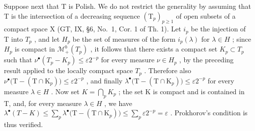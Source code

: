Suppose next that T is Polish. We do not restrict the generality by assuming that T is the intersection of a decreasing sequence \((\mathrm{T}_{p})_{p\geqslant1}\) of open subsets of a compact space X (GT, IX, §6, No.~1, Cor. 1 of Th. 1). Let \(i_{p}\) be the injection of T into \(T_{p}\) , and let \(H_{p}\) be the set of measures of the form \(i_{p}(\lambda)\) for \(\lambda\in H\) ; since \(H_{p}\) is compact in \(\mathcal{M}_{+}^{b}(T_{p})\) , it follows that there exists a compact set \(K_{p}\subset T_{p}\) such that \(\nu^{\bullet}(T_{p}-K_{p})\leqslant\varepsilon2^{-p}\) for every measure \(\nu\in H_{p}\) , by the preceding result applied to the locally compact space \(T_{p}\) . Therefore also \(\nu^{\bullet}\big(\mathrm{T}-(\mathrm{T}\cap\mathrm{K}_{p})\big)\leqslant\varepsilon2^{-p}\) , and finally \(\lambda^{\bullet}\big(\mathrm{T}-(\mathrm{T}\cap\mathrm{K}_{p})\big)\leqslant\varepsilon2^{-p}\) for every measure \(\lambda\in H\) . Now set \(K=\bigcap_{p}K_{p}\) ; the set K is compact and is contained in T, and, for every measure \(\lambda\in H\) , we have \(\lambda^{\bullet}(T-K)\leqslant\sum_{p}\lambda^{\bullet}\big(\mathrm{T}-(\mathrm{T}\cap\mathrm{K}_{p})\big)\leqslant\sum_{p}\varepsilon2^{-p}=\varepsilon\) . Prokhorov's condition is thus verified.


